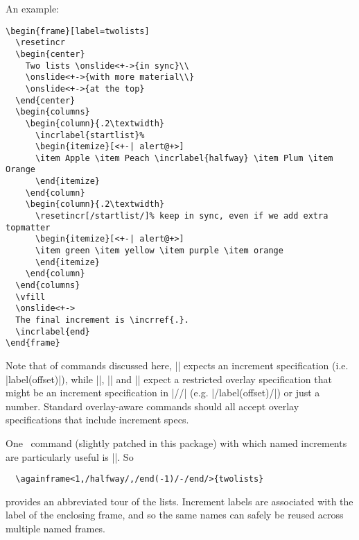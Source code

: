 \documentclass[a4paper]{ltxdoc}
\begin{document}
An example:
\example
\begin{verbatim}
\begin{frame}[label=twolists]
  \resetincr
  \begin{center}
    Two lists \onslide<+->{in sync}\\
    \onslide<+->{with more material\\}
    \onslide<+->{at the top}
  \end{center}
  \begin{columns}
    \begin{column}{.2\textwidth}
      \incrlabel{startlist}%
      \begin{itemize}[<+-| alert@+>]
      \item Apple \item Peach \incrlabel{halfway} \item Plum \item Orange
      \end{itemize}
    \end{column}
    \begin{column}{.2\textwidth}
      \resetincr[/startlist/]% keep in sync, even if we add extra topmatter
      \begin{itemize}[<+-| alert@+>]
      \item green \item yellow \item purple \item orange
      \end{itemize}
    \end{column}
  \end{columns}
  \vfill
  \onslide<+->
  The final increment is \incrref{.}. 
  \incrlabel{end}
\end{frame}
\end{verbatim}

Note that of commands discussed here, |\incrref| expects an increment
specification (i.e. |label(offset)|), while |\resetincr|, |\fromincr| and
|\incrlabel| expect a restricted overlay specification that might be an
increment specification in |//| (e.g. |/label(offset)/|) or just a number.
Standard overlay-aware commands should all accept overlay specifications that
include increment specs.

One \beamer\ command (slightly patched in this package) with which named
increments are particularly useful is |\againframe|.  So \example
\begin{verbatim}
  \againframe<1,/halfway/,/end(-1)/-/end/>{twolists}
\end{verbatim}
provides an abbreviated tour of the lists.  Increment labels are associated with
the label of the enclosing frame, and so the same names can safely be reused
across multiple named frames.
\end{document}

